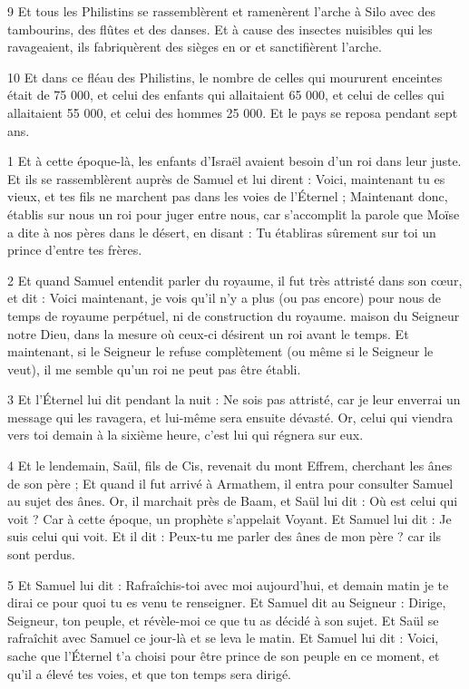 \par 9 Et tous les Philistins se rassemblèrent et ramenèrent l'arche à Silo avec des tambourins, des flûtes et des danses. Et à cause des insectes nuisibles qui les ravageaient, ils fabriquèrent des sièges en or et sanctifièrent l'arche.

\par 10 Et dans ce fléau des Philistins, le nombre de celles qui moururent enceintes était de 75 000, et celui des enfants qui allaitaient 65 000, et celui de celles qui allaitaient 55 000, et celui des hommes 25 000. Et le pays se reposa pendant sept ans.


\par 1 Et à cette époque-là, les enfants d'Israël avaient besoin d'un roi dans leur juste. Et ils se rassemblèrent auprès de Samuel et lui dirent : Voici, maintenant tu es vieux, et tes fils ne marchent pas dans les voies de l'Éternel ; Maintenant donc, établis sur nous un roi pour juger entre nous, car s'accomplit la parole que Moïse a dite à nos pères dans le désert, en disant : Tu établiras sûrement sur toi un prince d'entre tes frères.

\par 2 Et quand Samuel entendit parler du royaume, il fut très attristé dans son cœur, et dit : Voici maintenant, je vois qu'il n'y a plus (ou pas encore) pour nous de temps de royaume perpétuel, ni de construction du royaume. maison du Seigneur notre Dieu, dans la mesure où ceux-ci désirent un roi avant le temps. Et maintenant, si le Seigneur le refuse complètement (ou même si le Seigneur le veut), il me semble qu'un roi ne peut pas être établi.

\par 3 Et l'Éternel lui dit pendant la nuit : Ne sois pas attristé, car je leur enverrai un message qui les ravagera, et lui-même sera ensuite dévasté. Or, celui qui viendra vers toi demain à la sixième heure, c'est lui qui régnera sur eux.

\par 4 Et le lendemain, Saül, fils de Cis, revenait du mont Effrem, cherchant les ânes de son père ; Et quand il fut arrivé à Armathem, il entra pour consulter Samuel au sujet des ânes. Or, il marchait près de Baam, et Saül lui dit : Où est celui qui voit ? Car à cette époque, un prophète s’appelait Voyant. Et Samuel lui dit : Je suis celui qui voit. Et il dit : Peux-tu me parler des ânes de mon père ? car ils sont perdus.

\par 5 Et Samuel lui dit : Rafraîchis-toi avec moi aujourd'hui, et demain matin je te dirai ce pour quoi tu es venu te renseigner. Et Samuel dit au Seigneur : Dirige, Seigneur, ton peuple, et révèle-moi ce que tu as décidé à son sujet. Et Saül se rafraîchit avec Samuel ce jour-là et se leva le matin. Et Samuel lui dit : Voici, sache que l'Éternel t'a choisi pour être prince de son peuple en ce moment, et qu'il a élevé tes voies, et que ton temps sera dirigé.

